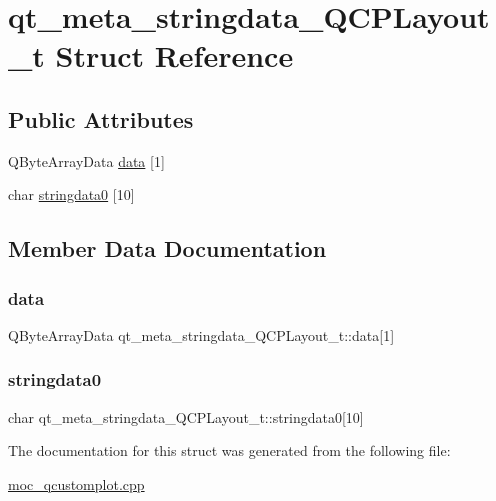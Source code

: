 \hypertarget{structqt__meta__stringdata__QCPLayout__t}{}\section{qt\+\_\+meta\+\_\+stringdata\+\_\+\+Q\+C\+P\+Layout\+\_\+t Struct Reference}
\label{structqt__meta__stringdata__QCPLayout__t}
\subsection*{Public Attributes}
\begin{DoxyCompactItemize}
\item 
Q\+Byte\+Array\+Data \mbox{\hyperlink{structqt__meta__stringdata__QCPLayout__t_a133fdcad1faf8247b373a50c8dcb604f}{data}} \mbox{[}1\mbox{]}
\item 
char \mbox{\hyperlink{structqt__meta__stringdata__QCPLayout__t_ad487cc776f3a79ee6a9f10c234b3ade0}{stringdata0}} \mbox{[}10\mbox{]}
\end{DoxyCompactItemize}


\subsection{Member Data Documentation}
\mbox{\label{structqt__meta__stringdata__QCPLayout__t_a133fdcad1faf8247b373a50c8dcb604f}} 
\subsubsection{\texorpdfstring{data}{data}}
{\footnotesize\ttfamily Q\+Byte\+Array\+Data qt\+\_\+meta\+\_\+stringdata\+\_\+\+Q\+C\+P\+Layout\+\_\+t\+::data\mbox{[}1\mbox{]}}

\mbox{\label{structqt__meta__stringdata__QCPLayout__t_ad487cc776f3a79ee6a9f10c234b3ade0}} 
\subsubsection{\texorpdfstring{stringdata0}{stringdata0}}
{\footnotesize\ttfamily char qt\+\_\+meta\+\_\+stringdata\+\_\+\+Q\+C\+P\+Layout\+\_\+t\+::stringdata0\mbox{[}10\mbox{]}}



The documentation for this struct was generated from the following file\+:\begin{DoxyCompactItemize}
\item 
\mbox{\hyperlink{moc__qcustomplot_8cpp}{moc\+\_\+qcustomplot.\+cpp}}\end{DoxyCompactItemize}
